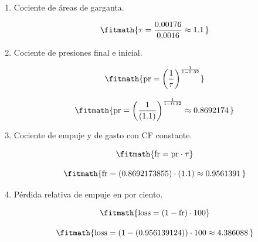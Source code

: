 \begin{enumerate}

\item Cociente de áreas de garganta.

\[\fitmath{\tau=\frac{0.00176}{0.0016}\approx 1.1\,}\]

\item Cociente de presiones final e inicial.

\[\fitmath{\mathrm{pr}={\left(\frac{1}{\tau}\right)}^{\frac{1}{1-0.32}}}\]

\[\fitmath{\mathrm{pr}={\left(\frac{1}{(1.1)}\right)}^{\frac{1}{1-0.32}}\approx 0.8692174\,}\]

\item Cociente de empuje y de gasto con CF constante.

\[\fitmath{\mathrm{fr}=\mathrm{pr}\cdot \tau}\]

\[\fitmath{\mathrm{fr}=(0.8692173855)\cdot (1.1)\approx 0.9561391\,}\]

\item Pérdida relativa de empuje en por ciento.

\[\fitmath{\mathrm{loss}=\left(1-\mathrm{fr}\right)\cdot 100}\]

\[\fitmath{\mathrm{loss}=\left(1-(0.956139124)\right)\cdot 100\approx 4.386088\,}\]

\end{enumerate}
